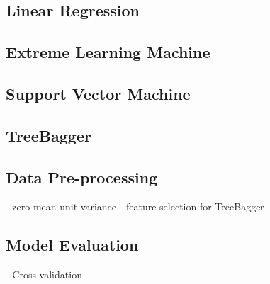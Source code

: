 \subsection{Linear Regression}
\subsection{Extreme Learning Machine}
\subsection{Support Vector Machine}
\subsection{TreeBagger}

\subsection{Data Pre-processing}
  - zero mean unit variance
  - feature selection for TreeBagger

\subsection{Model Evaluation}
  - Cross validation

